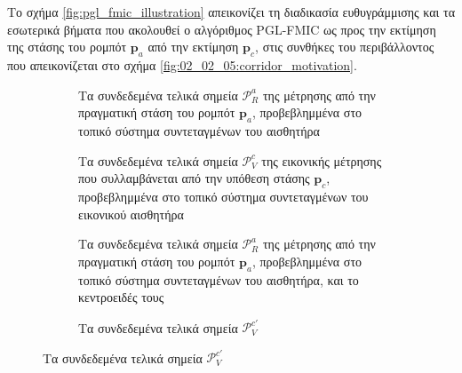 Το σχήμα \ref{fig:pgl_fmic_illustration} απεικονίζει τη διαδικασία ευθυγράμμισης
και τα εσωτερικά βήματα που ακολουθεί ο αλγόριθμος PGL-FMIC ως προς την
εκτίμηση της στάσης του ρομπότ $\bm{p}_a$ από την εκτίμηση $\bm{p}_c$, στις
συνθήκες του περιβάλλοντος που απεικονίζεται στο σχήμα
\ref{fig:02_02_05:corridor_motivation}.


\begin{figure}\centering
    \begin{subfigure}[t]{0.475\linewidth} \centering
        \hspace{0.5cm}
        \vspace{1em}
        \caption{\small Τα συνδεδεμένα τελικά σημεία $\mathcal{P}_R^a$ της
                 μέτρησης από την πραγματική στάση του ρομπότ $\bm{p}_a$,
                 προβεβλημμένα στο τοπικό σύστημα συντεταγμένων του αισθητήρα}
    \end{subfigure}
    \hfill
    \begin{subfigure}[t]{0.475\linewidth} \centering
        \hspace{0.5cm}
        \vspace{1em}
        \caption{\small Τα συνδεδεμένα τελικά σημεία $\mathcal{P}_V^c$ της
                 εικονικής μέτρησης που συλλαμβάνεται από την υπόθεση στάσης
                 $\bm{p}_c$, προβεβλημμένα στο τοπικό σύστημα συντεταγμένων του
                 εικονικού αισθητήρα}
    \end{subfigure}
    \begin{subfigure}[t]{0.475\linewidth} \centering
        \hspace{0.5cm}
        \vspace{1em}
        \caption {\small Τα συνδεδεμένα τελικά σημεία $\mathcal{P}_R^a$ της
                 μέτρησης από την πραγματική στάση του ρομπότ $\bm{p}_a$,
                 προβεβλημμένα στο τοπικό σύστημα συντεταγμένων του αισθητήρα,
                 και το κεντροειδές τους}
    \end{subfigure}
    \hfill
    \begin{subfigure}[t]{0.475\linewidth} \centering
        \hspace{0.5cm}
        \vspace{1em}
         \caption{\small Τα συνδεδεμένα τελικά σημεία $\mathcal{P}_V^{c\prime}$
}
\end{subfigure}
\end{figure}
